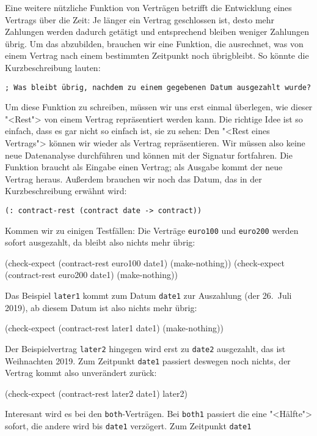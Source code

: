Eine weitere nützliche Funktion von Verträgen betrifft die Entwicklung
eines Vertrags über die Zeit: Je länger ein Vertrag geschlossen ist,
desto mehr Zahlungen werden dadurch getätigt und entsprechend bleiben
weniger Zahlungen übrig.  Um das abzubilden, brauchen wir eine
Funktion, die ausrechnet, was von einem Vertrag nach einem bestimmten
Zeitpunkt noch übrigbleibt.  So könnte die Kurzbeschreibung lauten:
%
\begin{lstlisting}
; Was bleibt übrig, nachdem zu einem gegebenen Datum ausgezahlt wurde?
\end{lstlisting}
%
Um diese Funktion zu schreiben, müssen wir uns erst einmal überlegen,
wie dieser "<Rest"> von einem Vertrag repräsentiert werden kann.  Die
richtige Idee ist so einfach, dass es gar nicht so einfach ist, sie zu
sehen: Den "<Rest eines Vertrags"> können wir wieder als Vertrag
repräsentieren.  Wir müssen also keine neue Datenanalyse durchführen
und können mit der Signatur fortfahren.  Die Funktion braucht als
Eingabe einen Vertrag; als Ausgabe kommt der neue Vertrag heraus.
Außerdem brauchen wir noch das Datum, das in der Kurzbeschreibung
erwähnt wird:
%
\begin{lstlisting}
(: contract-rest (contract date -> contract))
\end{lstlisting}
%
Kommen wir zu einigen Testfällen: Die Verträge \lstinline{euro100} und
\lstinline{euro200} werden sofort ausgezahlt, da bleibt also nichts
mehr übrig:
%
\begin{lstinline}
(check-expect (contract-rest euro100 date1) (make-nothing))
(check-expect (contract-rest euro200 date1) (make-nothing))
\end{lstinline}
%
Das Beispiel \lstinline{later1} kommt zum Datum \lstinline{date1} zur
Auszahlung (der 26.~Juli 2019), ab diesem Datum ist also nichts mehr
übrig:
%
\begin{lstinline}
(check-expect (contract-rest later1 date1) (make-nothing))
\end{lstinline}
%
Der Beispielvertrag \lstinline{later2} hingegen wird erst zu
\lstinline{date2} ausgezahlt, das ist Weihnachten 2019.  Zum Zeitpunkt
\lstinline{date1} passiert deswegen noch nichts, der Vertrag
kommt also unverändert zurück:
%
\begin{lstinline}
(check-expect (contract-rest later2 date1) later2)
\end{lstinline}
%
Interesant wird es bei den \lstinline{both}-Verträgen.  Bei
\lstinline{both1} passiert die eine "<Hälfte"> sofort, die andere wird
bis \lstinline{date1} verzögert.  Zum Zeitpunkt \lstinline{date1}
